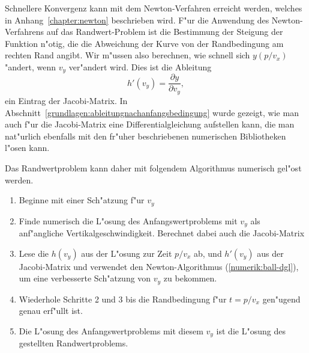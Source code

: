 Schnellere Konvergenz kann mit dem Newton-Verfahren erreicht werden,
welches in Anhang~\ref{chapter:newton} beschrieben wird.
F"ur die Anwendung des Newton-Verfahrens auf das Randwert-Problem
ist die Bestimmung der Steigung der Funktion n"otig, die die Abweichung
der Kurve von der Randbedingung am rechten Rand angibt.
Wir m"ussen also berechnen, wie schnell sich $y(p/v_x)$ "andert,
wenn $v_y$ ver"andert wird.
Dies ist die Ableitung
\[
h'(v_y)= \frac{\partial y}{\partial v_y},
\]
ein Eintrag der Jacobi-Matrix.
In Abschnitt~\ref{grundlagen:ableitungnachanfangsbedingung} wurde gezeigt, wie 
man auch f"ur die Jacobi-Matrix eine Differentialgleichung aufstellen kann, die
man nat"urlich ebenfalls mit den fr"uher beschriebenen numerischen
Bibliotheken l"osen kann.

Das Randwertproblem kann daher mit folgendem Algorithmus numerisch gel"ost
werden.
\begin{enumerate}
\item Beginne mit einer Sch"atzung f"ur $v_y$
\item Finde numerisch die L"osung des Anfangswertproblems mit $v_y$
als anf"angliche Vertikalgeschwindigkeit.
Berechnet dabei auch die Jacobi-Matrix
\item Lese die $h(v_y)$ aus der L"osung zur Zeit $p/v_x$ ab, und $h'(v_y)$
aus der Jacobi-Matrix und verwendet den Newton-Algorithmus
(\ref{numerik:ball-dgl}), um eine verbesserte Sch"atzung von $v_y$ 
zu bekommen.
\item Wiederhole Schritte 2 und 3 bis die Randbedingung f"ur $t=p/v_x$
gen"ugend genau erf"ullt ist.
\item Die L"osung des Anfangswertproblems mit diesem $v_y$ ist die
L"osung des gestellten Randwertproblems.
\end{enumerate}

